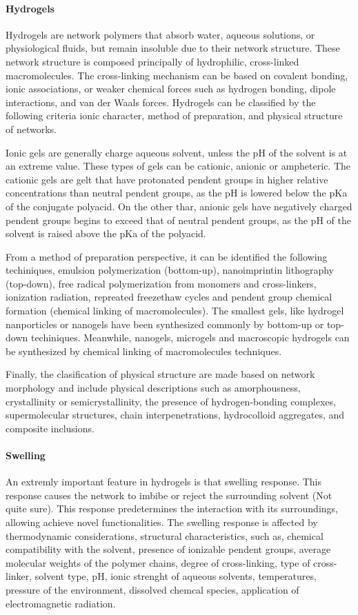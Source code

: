 \paragraph{Hydrogels}
Hydrogels are network polymers that absorb water, aqueous solutions, or physiological fluids, but remain insoluble due to their network structure.
These network structure is composed principally of hydrophilic, cross-linked macromolecules.
The cross-linking mechanism can be based on covalent bonding, ionic associations, or weaker chemical forces such as hydrogen bonding, dipole interactions, and van der Waals forces.
Hydrogels can be classified by the following criteria ionic character, method of preparation, and physical structure of networks.

Ionic gels are generally charge aqueous solvent, unless the pH of the solvent is at an extreme value.
These types of gels can be cationic, anionic or ampheteric.
The cationic gels are gelt that have protonated pendent groups in higher relative concentrations than neutral pendent groups, as the pH is lowered below the pKa of the conjugate polyacid.
On the other thar, anionic gels have negatively charged pendent groups begins to exceed that of neutral pendent groups, as the pH of the solvent is raised above the pKa of the polyacid.

From a method of preparation perspective, it can be identified the following techiniques,
        emulsion polymerization (bottom-up),
        nanoimprintin lithography (top-down),
        free radical polymerization from monomers and cross-linkers, ionization radiation, repreated freezethaw cycles and pendent group chemical formation (chemical linking of macromolecules).
The smallest gels, like hydrogel nanporticles or nanogels have been synthesized commonly by bottom-up or top-down techiniques.
Meanwhile, nanogels, microgels and macroscopic hydrogels can be synthesized by chemical linking of macromolecules techniques.

Finally, the clasification of physical structure are made based on network morphology and include physical descriptions such as amorphousness, crystallinity or semicrystallinity, the presence of hydrogen-bonding complexes, supermolecular structures, chain interpenetrations, hydrocolloid aggregates, and composite inclusions.


\paragraph{Swelling}
An extremly important feature in hydrogels is that swelling response.
This response causes the network to imbibe or reject the surrounding solvent (Not quite sure).
This response predetermines the interaction with its surroundings, allowing achieve novel functionalities.
The swelling response is affected by 
    thermodynamic considerations, 
    structural characteristics, such as, chemical compatibility with the solvent,
    presence of ionizable pendent groups,
    average molecular weights of the polymer chains,
    degree of cross-linking,
    type of cross-linker,
    solvent type,
    pH,
    ionic strenght of aqueous solvents,
    temperatures,
    pressure of the environment,
    dissolved chemcal species,
    application of electromagnetic radiation.

